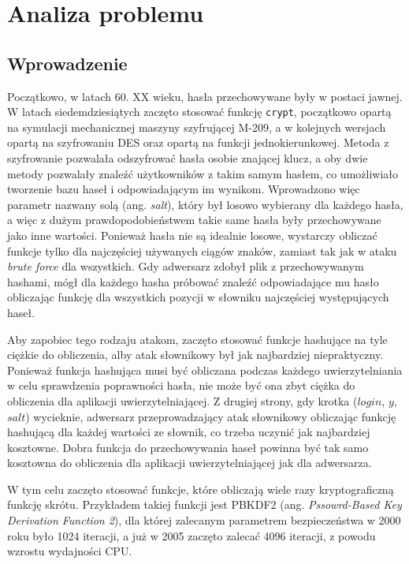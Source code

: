 \chapter{Analiza problemu}
\thispagestyle{chapterBeginStyle}
\label{rozdzial1}

\section{Wprowadzenie}

Początkowo, w latach 60. XX wieku, hasła przechowywane były w postaci jawnej.
W latach siedemdziesiątych zaczęto stosować funkcję \texttt{crypt}, początkowo opartą na symulacji mechanicznej maszyny szyfrującej M-209, a w kolejnych wersjach opartą na szyfrowaniu DES oraz opartą na funkcji jednokierunkowej. Metoda z szyfrowanie pozwalała odszyfrować hasła osobie znającej klucz, a oby dwie metody pozwalały znaleźć użytkowników z takim samym hasłem, co umożliwiało tworzenie bazu haseł i odpowiadającym im wynikom.
Wprowadzono więc parametr nazwany solą (ang. \textit{salt}), który był losowo wybierany dla każdego hasła, a więc z dużym prawdopodobieństwem takie same hasła były przechowywane jako inne wartości.
Ponieważ hasła nie są idealnie losowe, wystarczy obliczać funkcje tylko dla najczęściej używanych ciągów znaków, zamiast tak jak w ataku \textit{brute force} dla wszystkich.
Gdy adwersarz zdobył plik z przechowywanym hashami, mógł dla każdego hasha próbować znaleźć odpowiadające mu hasło obliczając funkcję dla wszystkich pozycji w słowniku najczęściej występujących haseł.

Aby zapobiec tego rodzaju atakom, zaczęto stosować funkcje hashujące na tyle ciężkie do obliczenia, alby atak słownikowy był jak najbardziej niepraktyczny. 
Ponieważ funkcja hashująca musi być obliczana podczas każdego uwierzytelniania w celu sprawdzenia poprawności hasła, nie może być ona zbyt ciężka do obliczenia dla aplikacji uwierzytelniającej.
Z drugiej strony, gdy krotka ($login$, $y$, $salt$) wycieknie, adwersarz przeprowadzający atak słownikowy obliczając funkcję hashującą dla każdej wartości ze słownik, co trzeba uczynić jak najbardziej kosztowne.
Dobra funkcja do przechowywania haseł powinna być tak samo kosztowna do obliczenia dla aplikacji uwierzytelniającej jak dla adwersarza.

W tym celu zaczęto stosować funkcje, które obliczają wiele razy kryptograficzną funkcję skrótu. Przykładem takiej funkcji jest PBKDF2 \cite{pbkdf2} (ang. \textit{Pssowrd-Based Key Derivation Function 2}), dla której zalecanym parametrem bezpieczeństwa w 2000 roku było 1024 iteracji, a już w 2005 zaczęto zalecać 4096 iteracji, z powodu wzrostu wydajności CPU.

